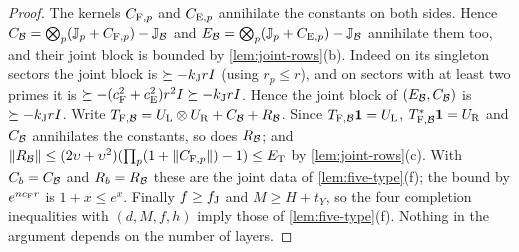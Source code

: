 \begin{proof}
The kernels $C_{{\rm F},p}$ and $C_{{\rm E},p}$ annihilate the constants on both
sides. Hence $C_\mathcal B=\bigotimes_p(\mathbb J_p+C_{{\rm F},p})-\mathbb J_\mathcal B$ and
$E_\mathcal B=\bigotimes_p(\mathbb J_p+C_{{\rm E},p})-\mathbb J_\mathcal B$ annihilate them too, and
their joint block is bounded by \cref{lem:joint-rows}(b). Indeed on its
singleton sectors the joint block is $\succeq-k_{\rm J}rI$ (using
$r_p\le r$), and on sectors with at least two primes it is
$\succeq-(c_{\rm F}^2+c_{\rm E}^2)r^2I\succeq-k_{\rm J}rI$.
Hence the joint block of $(E_\mathcal B,C_\mathcal B)$ is $\succeq-k_{\rm J}rI$.
Write
$T_{{\rm F},\mathcal B}=U_{\rm L}\otimes U_{\rm R}+C_\mathcal B+R_\mathcal B$. Since
$T_{{\rm F},\mathcal B}\mathbf 1=U_{\rm L}$, $T_{{\rm F},\mathcal B}^*\mathbf 1=U_{\rm R}$ and $C_\mathcal B$
annihilates the constants, so does $R_\mathcal B$; and
$\|R_\mathcal B\|\le(2\upsilon+\upsilon^2)(\prod_p(1+\|C_{{\rm F},p}\|)-1)\le E_{\rm T}$ by
\cref{lem:joint-rows}(c). With $C_b=C_\mathcal B$ and $R_b=R_\mathcal B$ these are the joint
data of \cref{lem:five-type}(f); the bound by $e^{nc_{\rm F}r}$ is $1+x\le e^x$.
Finally $f\ge f_{\rm J}$ and $M\ge H+t_Y$, so the four completion
inequalities with $(d,M,f,h)$ imply those of \cref{lem:five-type}(f). Nothing in
the argument depends on the number of layers.
\end{proof}

